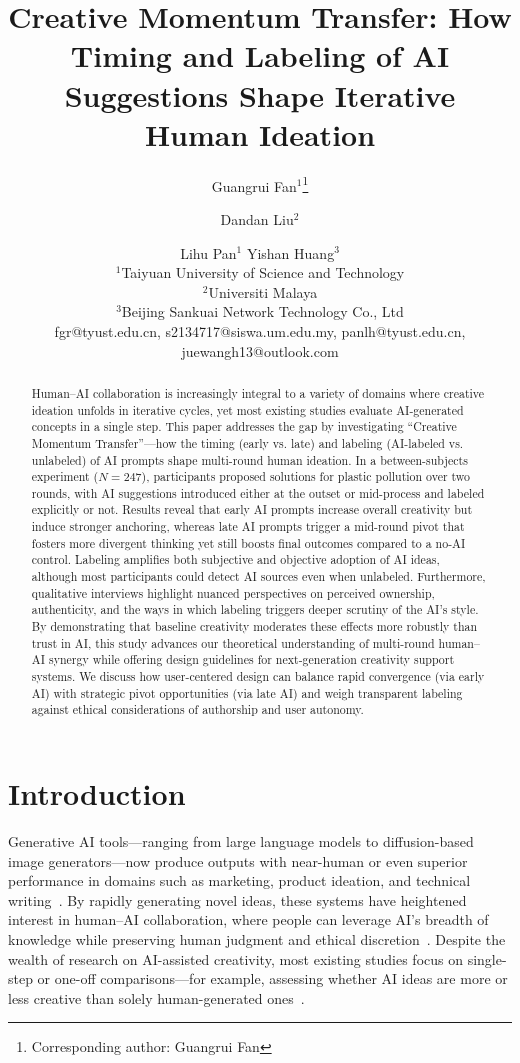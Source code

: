 \documentclass{article}
\title{Creative Momentum Transfer: How Timing and Labeling of AI Suggestions Shape Iterative Human Ideation}
\author{
Guangrui Fan$^{1}$\footnote{Corresponding author: Guangrui Fan}
\and
Dandan Liu$^{2}$\and
Lihu Pan$^{1}$\And
Yishan Huang$^{3}$\\
\affiliations
$^{1}$Taiyuan University of Science and Technology\\
$^{2}$Universiti Malaya\\
$^{3}$Beijing Sankuai Network Technology Co., Ltd\\
\emails
fgr@tyust.edu.cn,
s2134717@siswa.um.edu.my,
panlh@tyust.edu.cn,
juewangh13@outlook.com
}
\begin{document}
\maketitle

\begin{abstract}
Human–AI collaboration is increasingly integral to a variety of domains where creative ideation unfolds in iterative cycles, yet most existing studies evaluate AI-generated concepts in a single step. This paper addresses the gap by investigating “Creative Momentum Transfer”—how the timing (early vs. late) and labeling (AI-labeled vs. unlabeled) of AI prompts shape multi-round human ideation. In a between-subjects experiment (\(N = 247\)), participants proposed solutions for plastic pollution over two rounds, with AI suggestions introduced either at the outset or mid-process and labeled explicitly or not. Results reveal that early AI prompts increase overall creativity but induce stronger anchoring, whereas late AI prompts trigger a mid-round pivot that fosters more divergent thinking yet still boosts final outcomes compared to a no-AI control. Labeling amplifies both subjective and objective adoption of AI ideas, although most participants could detect AI sources even when unlabeled. Furthermore, qualitative interviews highlight nuanced perspectives on perceived ownership, authenticity, and the ways in which labeling triggers deeper scrutiny of the AI’s style. By demonstrating that baseline creativity moderates these effects more robustly than trust in AI, this study advances our theoretical understanding of multi-round human–AI synergy while offering design guidelines for next-generation creativity support systems. We discuss how user-centered design can balance rapid convergence (via early AI) with strategic pivot opportunities (via late AI) and weigh transparent labeling against ethical considerations of authorship and user autonomy.
\end{abstract}

\section{Introduction}

Generative AI tools—ranging from large language models to diffusion-based image generators—now produce outputs with near-human or even superior performance in domains such as marketing, product ideation, and technical writing~\cite{epstein2023art,kwon2024designer,reeves2024generative}. By rapidly generating novel ideas, these systems have heightened interest in human–AI collaboration, where people can leverage AI’s breadth of knowledge while preserving human judgment and ethical discretion~\cite{fui2023generative,ma2024human}. Despite the wealth of research on AI-assisted creativity, most existing studies focus on single-step or one-off comparisons—for example, assessing whether AI ideas are more or less creative than solely human-generated ones~\cite{doshi2024generative,burton2024large}.
\end{document}

